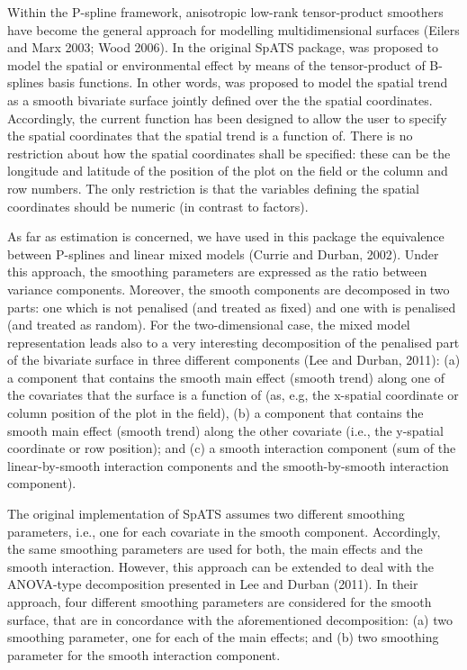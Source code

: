 \documentclass[a4paper]{book}
\begin{document}
%
\begin{Details}\relax


Within the P-spline framework, anisotropic low-rank tensor-product smoothers have become the general approach for modelling multidimensional surfaces (Eilers and Marx 2003; Wood 2006). In the original SpATS package, was proposed to model the spatial or environmental effect by means of the tensor-product of B-splines basis functions. In other words, was proposed to model the spatial trend as a smooth bivariate surface jointly defined over the the spatial coordinates. Accordingly, the current function has been designed to allow the user to specify the spatial coordinates that the spatial trend is a function of. There is no restriction about how the spatial coordinates shall be specified: these can be the longitude and latitude of the position of the plot on the field or the column and row numbers. The only restriction is that the variables defining the spatial coordinates should be numeric (in contrast to factors).

As far as estimation is concerned, we have used in this package the equivalence between P-splines and linear mixed models (Currie and Durban, 2002). Under this approach, the smoothing parameters are expressed as the ratio between variance components. Moreover, the smooth components are decomposed in two parts: one which is not penalised (and treated as fixed) and one with is penalised (and treated as random). For the two-dimensional case, the mixed model representation leads also to a very interesting decomposition of the penalised part of the bivariate surface in three different components (Lee and Durban, 2011): (a) a component that contains the smooth main effect (smooth trend)	along one of the covariates that the surface is a function of (as, e.g, the x-spatial coordinate or column position of the plot in the field), (b) a component that contains the smooth main effect (smooth trend) along the other covariate (i.e., the y-spatial coordinate or row position); and (c) a smooth interaction component (sum of the linear-by-smooth interaction components and the smooth-by-smooth interaction component). 

The original implementation of SpATS assumes two different smoothing parameters, i.e., one for each covariate in the smooth component. Accordingly, the same smoothing parameters are used for both, the main effects and the smooth interaction. However, this approach can be extended to deal with the ANOVA-type decomposition presented in Lee and Durban (2011). In their approach, four different smoothing parameters are considered for the smooth surface, that are in concordance with the aforementioned decomposition: (a) two smoothing parameter, one for each of the main effects; and (b) two smoothing parameter for the smooth interaction component.


\end{Details}
\end{document}
